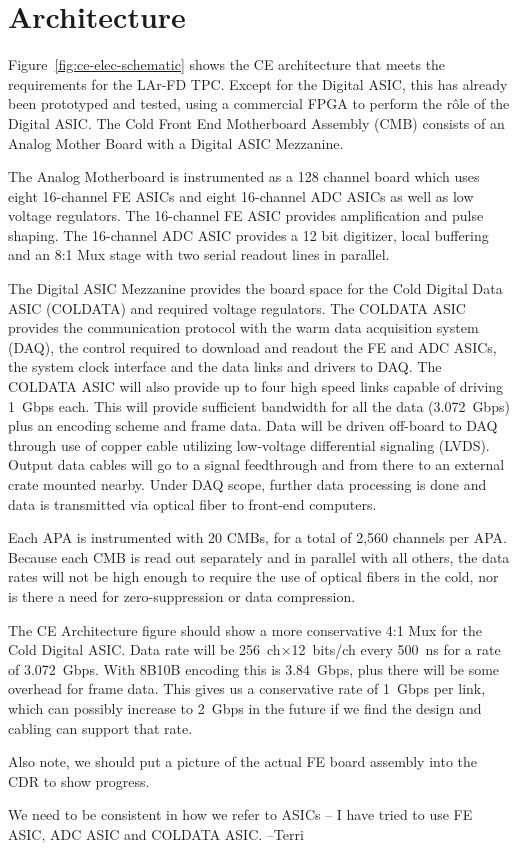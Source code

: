 %
\section{Architecture}
\label{sec:fe-arch}

Figure~\ref{fig:ce-elec-schematic} shows the CE architecture that meets the requirements for the LAr-FD TPC.
Except for the Digital ASIC, this has already been prototyped and tested,
using a commercial FPGA to perform the r\^ole of the Digital ASIC.  
The Cold Front End Motherboard Assembly (CMB) consists of an Analog Mother Board with a Digital ASIC Mezzanine.  

The Analog Motherboard is instrumented as a 128 channel board which uses eight 16-channel FE ASICs and
eight 16-channel ADC ASICs as well as low voltage regulators.
The 16-channel FE ASIC provides amplification and pulse shaping.
The 16-channel ADC ASIC provides a 12 bit digitizer, local buffering and an 8:1 Mux stage with two serial readout lines in parallel.

The Digital ASIC Mezzanine provides the board space for the Cold Digital Data ASIC (COLDATA) and required voltage regulators.
The COLDATA ASIC provides the communication protocol with the warm data acquisition system (DAQ),
the control required to download and readout the FE and ADC ASICs,
the system clock interface and the data links and drivers to DAQ.
The COLDATA ASIC will also provide up to four high speed links capable of driving 1~Gbps each.
This will provide sufficient bandwidth for all the data (3.072~Gbps) plus an encoding scheme and frame data.
Data will be driven off-board to DAQ through use of copper cable utilizing low-voltage differential signaling (LVDS).
Output data cables will go to a signal feedthrough and from there to an external crate mounted nearby.
Under DAQ scope, further data processing is done and data is transmitted via optical fiber to front-end computers.

Each APA is instrumented with 20 CMBs, for a total of 2,560 channels per APA.
Because each CMB is read out separately and in parallel with all others,
the data rates will not be high enough to require the use of optical fibers in the cold,
nor is there a need for zero-suppression or data compression.

\begin{editornote}
  The CE Architecture figure should show a more conservative 4:1 Mux for the Cold Digital ASIC.
  Data rate will be 256~ch$\times$12~bits/ch every 500~ns for a rate of 3.072~Gbps.
  With 8B10B encoding this is 3.84~Gbps, plus there will be some overhead for frame data.
  This gives us a conservative rate of 1~Gbps per link, which can possibly increase to 2~Gbps
  in the future if we find the design and cabling can support that rate.

  Also note, we should put a picture of the actual FE board assembly into the CDR to show progress.

  We need to be consistent in how we refer to ASICs -- I have tried to use FE ASIC, ADC ASIC and COLDATA ASIC.
  --Terri
\end{editornote}

